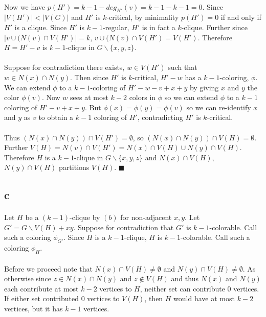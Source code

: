 \documentclass[letterpaper,12pt,oneside,onecolumn]{report}
\begin{document}
\paragraph{}
Now we have $p(H') = k-1 - deg_{H'}(v) = k-1 - k-1 = 0$. Since $|V(H')| < |V(G)|$ and $H'$ is $k$-critical, by minimality $p(H') = 0$ if and only if $H'$ is a clique. Since $H'$ is $k-1$-regular, $H'$ is in fact a $k$-clique. Further since $|v \cup (N(v) \cap V(H')| = k$, $v \cup (N(v) \cap V(H') = V(H')$. Therefore $H = H' - v$ is $k-1$-clique in $G\backslash \{x,y,z\}$.
\paragraph{}
Suppose for contradiction there exists, $w \in V(H')$ such that $w \in N(x) \cap N(y)$. Then since $H'$ is $k$-critical, $H' -w$ has a $k-1$-coloring, $\phi$. We can extend $\phi$ to a $k-1$-coloring of $H' -w - v + x + y$ by giving $x$ and $y$ the color $\phi(v)$. Now $w$ sees at most $k-2$ colors in $\phi$ so we can extend $\phi$ to a $k-1$ coloring of $H' - v + x + y$.  But $\phi(x) = \phi(y) = \phi(v)$  so we can re-identify $x$ and $y$ as $v$ to obtain a $k-1$ coloring of $H'$, contradicting $H'$ is $k$-critical.
\paragraph{}
Thus $(N(x) \cap N(y)) \cap V(H') = \emptyset$, so $(N(x) \cap N(y)) \cap V(H) = \emptyset$. Further $V(H) = N(v) \cap V(H') = N(x) \cap V(H) \cup N(y) \cap V(H)$. Therefore $H$ is a $k-1$-clique in $G\backslash \{x,y,z\}$ and $N(x) \cap V(H)$, $N(y) \cap V(H)$ partitions $V(H)$. $\blacksquare$
\subsection*{c}
\paragraph{}
Let $H$ be a $(k-1)$-clique by $(b)$ for non-adjacent $x,y$. Let $G' = G\backslash V(H) + xy$. Suppose for contradiction that $G'$ is $k-1$-colorable. Call such a coloring $\phi_{G'}$. Since $H$ is a $k-1$-clique, $H$ is $k-1$-colorable. Call such a coloring $\phi_{H}$. 
\paragraph{}
Before we proceed note that $N(x) \cap V(H) \neq \emptyset$ and $N(y) \cap V(H) \neq \emptyset$. As otherwise since $z \in N(x) \cap N(y)$ and $z \not \in V(H)$ and thus $N(x)$ and $N(y)$ each contribute at most $k-2$ vertices to $H$, neither set can contribute $0$ vertices. If either set contributed $0$ vertices to $V(H)$, then $H$ would have at most $k-2$ vertices, but it has $k-1$ vertices.
\end{document}
